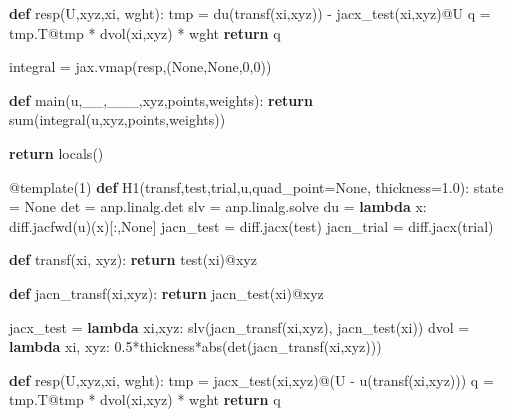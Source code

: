 \documentclass[
  11pt,
]{article}
\newenvironment{Shaded}{}{}
\newcommand{\AttributeTok}[1]{\textcolor[rgb]{0.49,0.56,0.16}{#1}}
\newcommand{\BuiltInTok}[1]{#1}
\newcommand{\ControlFlowTok}[1]{\textcolor[rgb]{0.00,0.44,0.13}{\textbf{#1}}}
\newcommand{\DecValTok}[1]{\textcolor[rgb]{0.25,0.63,0.44}{#1}}
\newcommand{\FloatTok}[1]{\textcolor[rgb]{0.25,0.63,0.44}{#1}}
\newcommand{\KeywordTok}[1]{\textcolor[rgb]{0.00,0.44,0.13}{\textbf{#1}}}
\newcommand{\NormalTok}[1]{#1}
\newcommand{\OperatorTok}[1]{\textcolor[rgb]{0.40,0.40,0.40}{#1}}
\newcommand{\VariableTok}[1]{\textcolor[rgb]{0.10,0.09,0.49}{#1}}
\begin{document}
\begin{Shaded}
\begin{Highlighting}[]
    
    \KeywordTok{def}\NormalTok{ resp(U,xyz,xi, wght):}
\NormalTok{        tmp }\OperatorTok{=}\NormalTok{ du(transf(xi,xyz)) }\OperatorTok{{-}}\NormalTok{ jacx\_test(xi,xyz)}\OperatorTok{@}\NormalTok{U}
\NormalTok{        q }\OperatorTok{=}\NormalTok{ tmp.T}\OperatorTok{@}\NormalTok{tmp }\OperatorTok{*}\NormalTok{ dvol(xi,xyz) }\OperatorTok{*}\NormalTok{ wght}
        \ControlFlowTok{return}\NormalTok{ q}

\NormalTok{    integral }\OperatorTok{=}\NormalTok{ jax.vmap(resp,(}\VariableTok{None}\NormalTok{,}\VariableTok{None}\NormalTok{,}\DecValTok{0}\NormalTok{,}\DecValTok{0}\NormalTok{))}

    \KeywordTok{def}\NormalTok{ main(u,\_\_,\_\_\_,xyz,points,weights):}
        \ControlFlowTok{return} \BuiltInTok{sum}\NormalTok{(integral(u,xyz,points,weights))}
    
    \ControlFlowTok{return} \BuiltInTok{locals}\NormalTok{()}

\AttributeTok{@template}\NormalTok{(}\DecValTok{1}\NormalTok{)}
\KeywordTok{def}\NormalTok{ H1(transf,test,trial,u,quad\_point}\OperatorTok{=}\VariableTok{None}\NormalTok{, thickness}\OperatorTok{=}\FloatTok{1.0}\NormalTok{):}
\NormalTok{    state }\OperatorTok{=} \VariableTok{None}
\NormalTok{    det }\OperatorTok{=}\NormalTok{ anp.linalg.det}
\NormalTok{    slv }\OperatorTok{=}\NormalTok{ anp.linalg.solve}
\NormalTok{    du }\OperatorTok{=} \KeywordTok{lambda}\NormalTok{ x: diff.jacfwd(u)(x)[:,}\VariableTok{None}\NormalTok{]}
\NormalTok{    jacn\_test }\OperatorTok{=}\NormalTok{ diff.jacx(test)}
\NormalTok{    jacn\_trial }\OperatorTok{=}\NormalTok{ diff.jacx(trial)}

    \KeywordTok{def}\NormalTok{ transf(xi, xyz):}
        \ControlFlowTok{return}\NormalTok{ test(xi)}\OperatorTok{@}\NormalTok{xyz}
    
    \KeywordTok{def}\NormalTok{ jacn\_transf(xi,xyz):}
        \ControlFlowTok{return}\NormalTok{ jacn\_test(xi)}\OperatorTok{@}\NormalTok{xyz}

\NormalTok{    jacx\_test }\OperatorTok{=} \KeywordTok{lambda}\NormalTok{ xi,xyz: slv(jacn\_transf(xi,xyz), jacn\_test(xi))}
\NormalTok{    dvol }\OperatorTok{=} \KeywordTok{lambda}\NormalTok{ xi, xyz: }\FloatTok{0.5}\OperatorTok{*}\NormalTok{thickness}\OperatorTok{*}\BuiltInTok{abs}\NormalTok{(det(jacn\_transf(xi,xyz)))}

    \KeywordTok{def}\NormalTok{ resp(U,xyz,xi, wght):}
\NormalTok{        tmp }\OperatorTok{=}\NormalTok{ jacx\_test(xi,xyz)}\OperatorTok{@}\NormalTok{(U }\OperatorTok{{-}}\NormalTok{ u(transf(xi,xyz)))}
\NormalTok{        q }\OperatorTok{=}\NormalTok{ tmp.T}\OperatorTok{@}\NormalTok{tmp }\OperatorTok{*}\NormalTok{ dvol(xi,xyz) }\OperatorTok{*}\NormalTok{ wght}
        \ControlFlowTok{return}\NormalTok{ q}


\end{Highlighting}
\end{Shaded}
\end{document}
